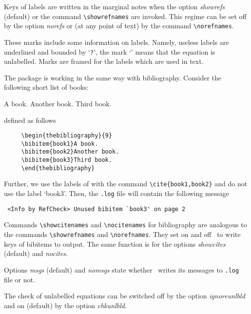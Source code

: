 \documentclass[11pt]{article}
\begin{document}
Keys of labels are written in the marginal notes when the option
\textit{showrefs\/} (default) or the command \verb#\showrefnames# are
invoked. This regime can be set off by the option \textit{norefs} or (at
any point of text) by the command \verb#\norefnames#.

These marks include some information on labels.  Namely, useless
labels are underlined and bounded by `\texttt{?}', the mark `\unl@bld@mark'
means that the equation is unlabelled.  Marks are framed for
the labels which are used in text.

\newpage

The package is working in the same way with bibliography.
Consider the following short list of books:

\vspace{-1\baselineskip}

\begin{thebibliography}{9}
A book.
Another book.
Third book.
\end{thebibliography}
defined as follows
\begin{verbatim}
     \begin{thebibliography}{9}
     \bibitem{book1}A book.
     \bibitem{book2}Another book.
     \bibitem{book3}Third book.
     \end{thebibliography}
\end{verbatim}
Further, we use the labels of \cite{book1,book2} with the
command \verb#\cite{book1,book2}# and do not use the label
`book3'. Then, the \texttt{.log} file will contain the following message
{\small
\begin{verbatim}
 <Info by RefCheck> Unused bibitem `book3' on page 2
\end{verbatim}}

Commands \verb#\showcitenames# and \verb#\nocitenames# for
bibliography are analogous to the commands \verb#\showrefnames# and
\verb#\norefnames#.  They set on and off \RefCheck\ to write keys of
bibitems to output.  The same function is for the options
\textit{showcites\/} (default) and \textit{nocites}.

Options \textit{msgs\/} (default) and \textit{nomsgs\/} state whether
\RefCheck\ writes its messages to \texttt{.log} file or not.

The check of unlabelled equations can be switched off by the option
\mbox{\textit{ignoreunlbld\/}} and on (default) by the option
\textit{chkunlbld\/}.

\medskip
\end{document}
